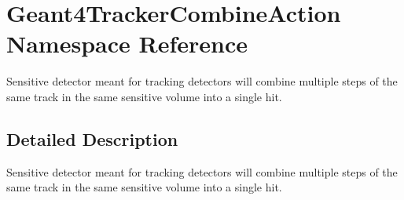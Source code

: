 \hypertarget{namespace_geant4_tracker_combine_action}{
\section{Geant4TrackerCombineAction Namespace Reference}
\label{namespace_geant4_tracker_combine_action}
}


Sensitive detector meant for tracking detectors will combine multiple steps of the same track in the same sensitive volume into a single hit.  


\subsection{Detailed Description}
Sensitive detector meant for tracking detectors will combine multiple steps of the same track in the same sensitive volume into a single hit. 